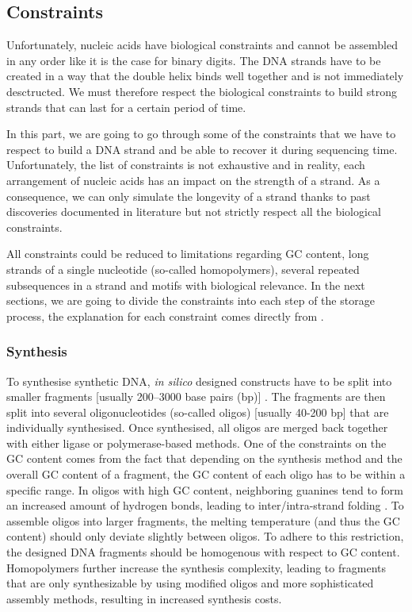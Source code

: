 \subsection{Constraints}

Unfortunately, nucleic acids have biological constraints and cannot be assembled in any order like it is the case for binary digits. The DNA strands have to be created in a way that the double helix binds well together and is not immediately desctructed. We must therefore respect the biological constraints to build strong strands that can last for a certain period of time. 

In this part, we are going to go through some of the constraints that we have to respect to build a DNA strand and be able to recover it during sequencing time. Unfortunately, the list of constraints is not exhaustive and in reality, each arrangement of nucleic acids has an impact on the strength of a strand. As a consequence, we can only simulate the longevity of a strand thanks to past discoveries documented in literature but not strictly respect all the biological constraints. 

All constraints could be reduced to limitations regarding GC content, long strands of a single nucleotide (so-called homopolymers), several repeated subsequences in a strand and motifs with biological relevance. In the next sections, we are going to divide the constraints into each step of the storage process, the explanation for each constraint comes directly from \cite{bib:10.1093/bioinformatics/btaa140}.

\subsubsection{Synthesis}

To synthesise synthetic DNA, \textit{in silico} designed constructs have to be split into smaller fragments [usually 200–3000 base pairs (bp)] \cite{bib:101038}. The fragments are then split into several oligonucleotides (so-called oligos) [usually 40-200 bp] that are individually synthesised. Once synthesised, all oligos are merged back together with either ligase or polymerase-based methods. One of the constraints on the GC content comes from the fact that depending on the synthesis method and the overall GC content of a fragment,  the GC content of each oligo has to be within a specific range. In oligos with high GC content, neighboring guanines tend to form an increased amount of hydrogen bonds, leading to inter/intra-strand folding \cite{bib:101371}.
To assemble oligos into larger fragments, the melting temperature (and thus the GC content) should only deviate slightly between oligos. To adhere to this restriction, the designed DNA fragments should be homogenous with respect to GC content. Homopolymers further increase the synthesis complexity, leading to fragments that are only synthesizable by using modified oligos and more sophisticated assembly methods, resulting in increased synthesis costs.

